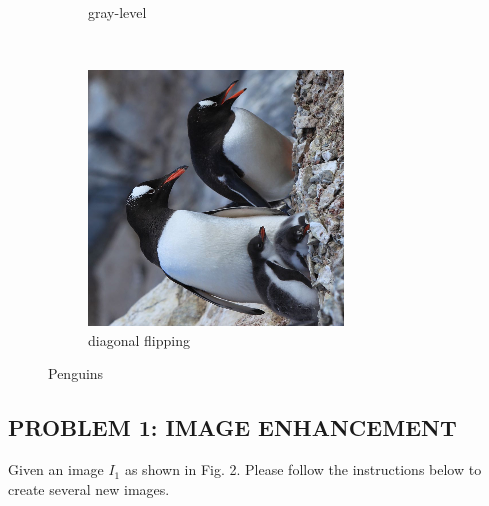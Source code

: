 \documentclass{article}
\begin{document}
\begin{figure}[!htb]
\begin{subfigure}[b]{0.3\textwidth}
        \caption{gray-level}
    \end{subfigure}
    ~
    \begin{subfigure}[b]{0.3\textwidth}
        \includegraphics[width=\textwidth]{img/B.png}
        \caption{diagonal flipping}
    \end{subfigure}
    \caption{Penguins}
    \label{Penguins}
\end{figure}

\subsection*{PROBLEM 1: IMAGE ENHANCEMENT}

Given an image $I_1$ as shown in Fig. 2. Please follow the instructions below to create several new images.
\end{document}
